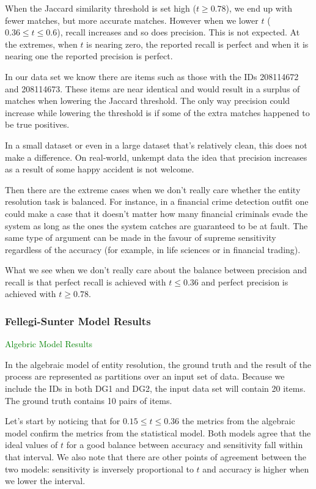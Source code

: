 \documentclass[lettersize,journal]{IEEEtran}
\begin{document}
    When the Jaccard similarity threshold is set high ($t \geq 0.78$), we end up
    with fewer matches, but more accurate matches.
    However when we lower $t$ ($0.36 \leq t \leq 0.6$), recall increases and
    so does precision.
    This is not expected.
    At the extremes, when $t$ is nearing zero, the reported recall is perfect
    and when it is nearing one the reported precision is perfect.
    
    In our data set we know there are items such as those with the IDs
    208114672 and 208114673.
    These items are near identical and would result in a surplus of matches
    when lowering the Jaccard threshold.
    The only way precision could increase while lowering the threshold is if
    some of the extra matches happened to be true positives.

    In a small dataset or even in a large dataset that's relatively clean, this
    does not make a difference.
    On real-world, unkempt data the idea that precision increases as a result of
    some happy accident is not welcome.
    
    Then there are the extreme cases when we don't really care whether the
    entity resolution task is balanced.
    For instance, in a financial crime detection outfit one could make a case
    that it doesn't matter how many financial criminals evade the system as long
    as the ones the system catches are guaranteed to be at fault.
    The same type of argument can be made in the favour of supreme sensitivity
    regardless of the accuracy (for example, in life sciences or in financial
    trading).

    What we see when we don't really care about the balance between precision
    and recall is that perfect recall is achieved with $t \leq 0.36$ and perfect
    precision is achieved with $t \geq 0.78$.

    \subsubsection{Fellegi-Sunter Model Results}
    \textcolor{green}{Algebric Model Results}
    
    In the algebraic model of entity resolution, the ground truth and the result
    of the process are represented as partitions over an input set of data.
    Because we include the IDs in both DG1 and DG2, the input data set will
    contain 20 items.
    The ground truth contains 10 pairs of items.

    Let's start by noticing that for $0.15 \leq t \leq 0.36$ the metrics from
    the algebraic model confirm the metrics from the statistical model.
    Both models agree that the ideal values of $t$ for a good balance between
    accuracy and sensitivity fall within that interval.
    We also note that there are other points of agreement between the two
    models: sensitivity is inversely proportional to $t$ and accuracy is higher
    when we lower the interval.
\end{document}
